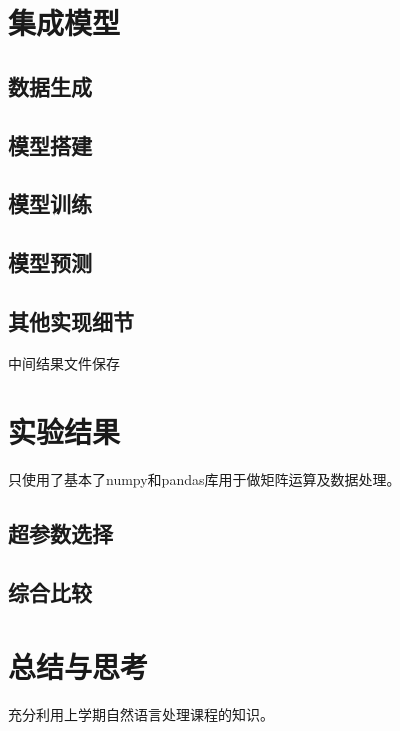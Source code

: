 \documentclass[logo,reportComp]{thesis}
\begin{document}
\section{集成模型}
\subsection{数据生成}
\subsection{模型搭建}
\subsection{模型训练}
\subsection{模型预测}
\subsection{其他实现细节}
中间结果文件保存

\section{实验结果}
只使用了基本了numpy和pandas库用于做矩阵运算及数据处理。

\subsection{超参数选择}
\subsection{综合比较}
\section{总结与思考}
充分利用上学期自然语言处理课程的知识。

\begin{thebibliography}{99}
\end{thebibliography}
\end{document}
